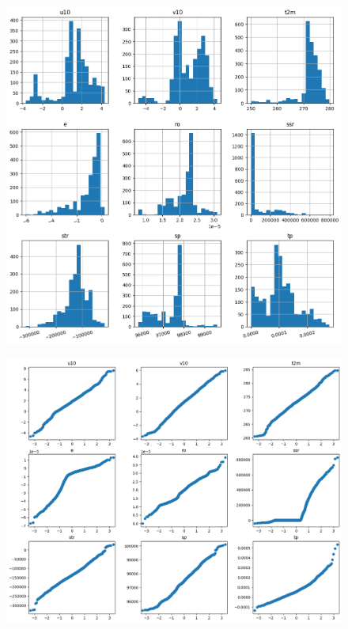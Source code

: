 \begin{figure}[H]
    \centering
    \includegraphics[width=\textwidth]{images/dt_hist.png}
    \caption{}
    \label{dt-hist}
\end{figure}

\begin{figure}[H]
    \centering
    \includegraphics[width=\textwidth]{images/svr_qq.png}
    \caption{}
    \label{svr-qq}
\end{figure}

